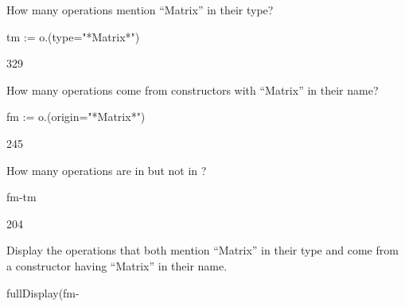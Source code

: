 {{{{{{{\begin{xtc}
\begin{xtccomment}
How many operations mention ``Matrix'' in their type?
\end{xtccomment}
\begin{spadsrc}
tm := o.(type="*Matrix*")
\end{spadsrc}
\begin{TeXOutput}
\begin{fricasmath}{11}
329%
\end{fricasmath}
\end{TeXOutput}
\end{xtc}
\begin{xtc}
\begin{xtccomment}
How many operations come from constructors with ``Matrix'' in
their name?
\end{xtccomment}
\begin{spadsrc}
fm := o.(origin="*Matrix*")
\end{spadsrc}
\begin{TeXOutput}
\begin{fricasmath}{12}
245%
\end{fricasmath}
\end{TeXOutput}
\end{xtc}
\begin{xtc}
\begin{xtccomment}
How many operations are in  but not in ?
\end{xtccomment}
\begin{spadsrc}
fm-tm 
\end{spadsrc}
\begin{TeXOutput}
\begin{fricasmath}{13}
204%
\end{fricasmath}
\end{TeXOutput}
\end{xtc}
\begin{xtc}
\begin{xtccomment}
Display the operations that both mention ``Matrix'' in their type
and come from a constructor having ``Matrix'' in their name.
\end{xtccomment}
\begin{spadsrc}
fullDisplay(fm-%
\end{spadsrc}
\end{xtc}
\begin{xtc}
\begin{xtccomment}

\end{xtccomment}
\end{xtc}}}}}}}}
